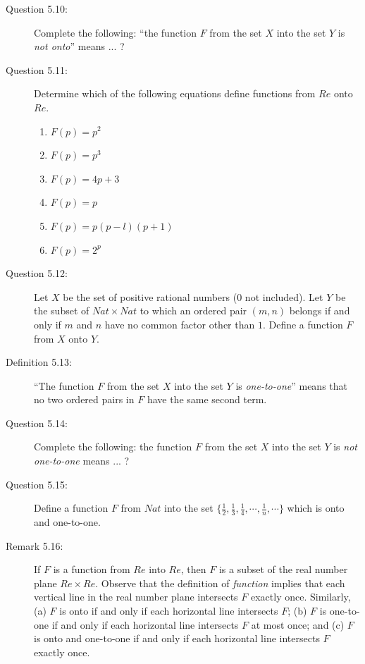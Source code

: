 \documentclass{book}
\begin{document}
\begin{description}
\item[Question 5.10:] Complete the following: ``the function $F$ from the set $X$ into the set $Y$ is \emph{not onto}'' means ... ?

\item[Question 5.11:] Determine which of the following equations define functions from $Re$ onto $Re$.
\begin{enumerate}[\hspace{1cm}(a)]
  \item $F(p) = p^{2}$
  \item $F(p) = p^{3}$
  \item $F(p) = 4p + 3$
  \item $F(p) = p$
  \item $F(p) = p(p - l)(p + 1)$
  \item $F(p) = 2^{p}$
\end{enumerate}

\item[Question 5.12:] Let $X$ be the set of positive rational numbers ($0$ not included). Let $Y$ be the subset of $Nat \times Nat$ to which an ordered pair $(m,n)$ belongs if and only if $m$ and $n$ have no common factor other than $1$. Define a function $F$ from $X$ onto $Y$.

\item[Definition 5.13:] ``The function $F$ from the set $X$ into the set $Y$ is \emph{one-to-one}'' means that no two ordered pairs in $F$ have the same second term.

\item[Question 5.14:] Complete the following: the function $F$ from the set $X$ into the set $Y$ is \emph{not one-to-one} means ... ?

\item[Question 5.15:] Define a function $F$ from $Nat$ into the set $\{ \frac{1}{2}, \frac{1}{3}, \frac{1}{4}, \cdots, \frac{1}{n}, \cdots \}$ which is onto and one-to-one.

\item[Remark 5.16:] If $F$ is a function from $Re$ into $Re$, then $F$ is a subset of the real number plane $Re \times Re$. Observe that the definition of \emph{function} implies that each vertical line in the real number plane intersects $F$ exactly once. Similarly, (a) $F$ is onto if and only if each horizontal line intersects $F$; (b) $F$ is one-to-one if and only if each horizontal line intersects $F$ at most once; and (c) $F$ is onto and one-to-one if and only if each horizontal line intersects $F$ exactly once.


\end{description}
\end{document}
